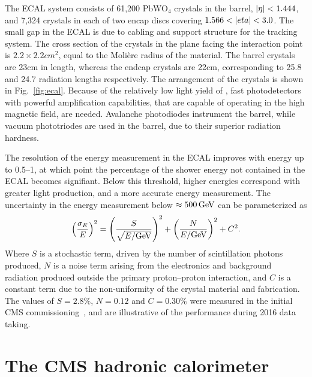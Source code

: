 The ECAL system consists of 61,200 PbWO$_4$ crystals in the barrel, $\lvert \eta \rvert < 1.444$,
and 7,324 crystals in each of two encap discs covering $1.566 < \lvert eta \rvert < 3.0$.
The small gap in the ECAL is due to cabling and support structure for the tracking system.
The cross section of the crystals in the plane facing the interaction point is $2.2\times2.2\unit{cm}^2$,
equal to the Moli{\`e}re radius of the material. The barrel crystals are 23\unit{cm} in
length, whereas the endcap crystals are 22\unit{cm}, corresponding to 
25.8 and 24.7 radiation lengths respectively. The arrangement of the crystals is shown in Fig.~\ref{fig:ecal}.
Because of the relatively low light yield of {\PbT}, fast photodetectors with
powerful amplification capabilities, that are capable of operating in the high magnetic
field, are needed. Avalanche photodiodes instrument the barrel, while vacuum phototriodes
are used in the barrel, due to their superior radiation hardness.

The resolution of the energy measurement in the ECAL improves with energy up to 
0.5--1\TeV, at which point the percentage of the shower energy not contained in the ECAL becomes
signifiant. Below this threshold, higher energies correspond with greater light production,
and a more accurate energy measurement. The uncertainty in the energy measurement
below $\approx500\,\text{Ge\hspace{-.08em}V}$ can be parameterized as
\begin{equation}
  \left(\frac{\sigma_E}{E}\right)^2 = \left(\frac{S}{\sqrt{E/\text{Ge\hspace{-.08em}V}}}\right)^2 + \left(\frac{N}{E/\text{Ge\hspace{-.08em}V}}\right)^2 + C^2.
  \label{eq:resolution}
\end{equation}
Where $S$ is a stochastic term, driven by the number of scintillation photons produced,
$N$ is a noise term arising from the electronics and background radiation produced
outside the primary proton--proton interaction, and $C$ is a constant term due to
the non-uniformity of the crystal material and fabrication.
The values of $S=2.8\%$, $N=0.12$ and $C=0.30\%$ were measured in the initial 
CMS commissioning~\cite{Chatrchyan:2008aa}, 
and are illustrative of the performance during 2016 data taking.

\section{The CMS hadronic calorimeter}

